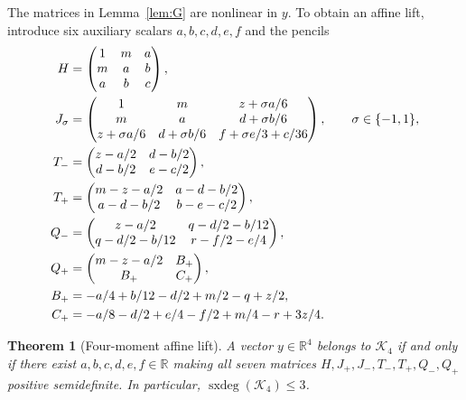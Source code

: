 \documentclass[pdflatex,sn-mathphys-num]{sn-jnl}
\theoremstyle{thmstyleone}
\newtheorem{theorem}{Theorem}
\theoremstyle{thmstyletwo}\newtheorem{remark}[theorem]{Remark}
\newcommand{\R}{\mathbb R}
\newcommand{\K}{\mathcal K}
\newcommand{\sxdeg}{\operatorname{sxdeg}}
\begin{document}
The matrices in Lemma~\ref{lem:G} are nonlinear in $y$. To obtain an
affine lift, introduce six auxiliary scalars $a,b,c,d,e,f$ and the pencils
\begin{align}
 H&=\begin{pmatrix}1&m&a\\m&a&b\\a&b&c\end{pmatrix},\label{eq:H}\\
 J_\sigma&=\begin{pmatrix}
 1&m&z+\sigma a/6\\m&a&d+\sigma b/6\\
 z+\sigma a/6&d+\sigma b/6&f+\sigma e/3+c/36
 \end{pmatrix},\qquad \sigma\in\{-1,1\},\label{eq:J}\\
 T_-&=\begin{pmatrix}z-a/2&d-b/2\\d-b/2&e-c/2\end{pmatrix},\notag\\
 T_+&=\begin{pmatrix}m-z-a/2&a-d-b/2\\a-d-b/2&b-e-c/2\end{pmatrix},\label{eq:T}\\
 Q_-&=\begin{pmatrix}z-a/2&q-d/2-b/12\\q-d/2-b/12&r-f/2-e/4\end{pmatrix},\notag\\
 Q_+&=\begin{pmatrix}m-z-a/2&B_+\\ B_+&C_+\end{pmatrix},\label{eq:Q}\\
 B_+&=-a/4+b/12-d/2+m/2-q+z/2,\notag\\
 C_+&=-a/8-d/2+e/4-f/2+m/4-r+3z/4.\notag
\end{align}

\begin{theorem}[Four-moment affine lift]\label{thm:lift}
 A vector $y\in\R^4$ belongs to $\K_4$ if and only if there exist
 $a,b,c,d,e,f\in\R$ making all seven matrices
 $H,J_+,J_-,T_-,T_+,Q_-,Q_+$ positive semidefinite.
 In particular, $\sxdeg(\K_4)\le3$.
\end{theorem}
\end{document}
